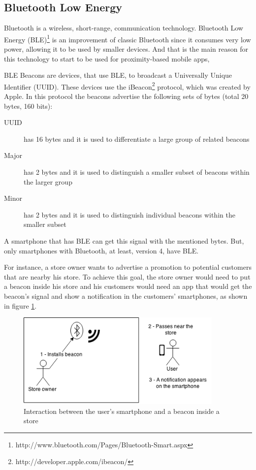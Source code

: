 \subsection{Bluetooth Low Energy}
\label{sub:bluetooth_low_energy}
Bluetooth is a wireless, short-range, communication technology.
Bluetooth Low Energy (BLE)\footnote{http://www.bluetooth.com/Pages/Bluetooth-Smart.aspx} 
is an improvement of classic Bluetooth since it consumes 
very low power, allowing it to be used by smaller devices.
And that is the main reason for this technology to start to 
be used for proximity-based mobile apps,

BLE Beacons are devices, that use BLE, to broadcast a 
Universally Unique Identifier (UUID). 
These devices use the 
iBeacon\footnote{http://developer.apple.com/ibeacon/} 
protocol, which was created
by Apple\texttrademark. In this protocol the beacons
advertise the following sets of bytes
(total 20 bytes, 160 bits):
\begin{description}
  \item[UUID] has 16 bytes and it is used to differentiate a 
  large group of related beacons
  \item[Major] has 2 bytes and it is used to distinguish a smaller 
  subset of beacons within the larger group
  \item[Minor] has 2 bytes and it is used to distinguish individual
  beacons within the smaller subset
\end{description}
A smartphone that
has BLE can get this signal with the mentioned bytes.
But, only smartphones
with Bluetooth, at least, version 4, have BLE.

For instance, a store owner wants to advertise a promotion
to potential customers that are nearby his store. To 
achieve this goal, the store owner would need to put
a beacon inside his store and his customers would need an
app that would get the beacon's signal and show a 
notification in the customers' smartphones,
as shown in figure \ref{fig:store_example}.
\begin{figure}[!ht]
  \centering
    \includegraphics[width=0.9\textwidth]{img/store_example}
    \caption{Interaction between the user's smartphone
    and a beacon inside a store}
    \label{fig:store_example}
\end{figure}

